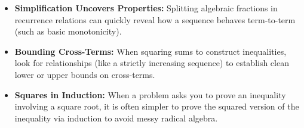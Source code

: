 \begin{takeaways}
\begin{itemize}
    \item \textbf{Simplification Uncovers Properties:} Splitting algebraic fractions in recurrence relations can quickly reveal how a sequence behaves term-to-term (such as basic monotonicity).
    \item \textbf{Bounding Cross-Terms:} When squaring sums to construct inequalities, look for relationships (like a strictly increasing sequence) to establish clean lower or upper bounds on cross-terms. 
    \item \textbf{Squares in Induction:} When a problem asks you to prove an inequality involving a square root, it is often simpler to prove the squared version of the inequality via induction to avoid messy radical algebra.
\end{itemize}
\end{takeaways}
